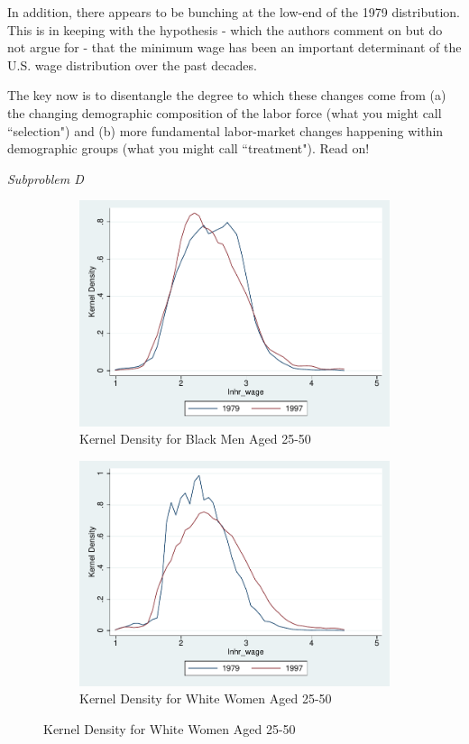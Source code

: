 \documentclass[11pt]{article}
\begin{document}
\bigskip In addition, there appears to be bunching at the low-end of the 1979 distribution. This is in keeping with the hypothesis - which the authors comment on but do not argue for - that the minimum wage has been an important determinant of the U.S. wage distribution over the past decades.

\bigskip The key now is to disentangle the degree to which these changes come from (a) the changing demographic composition of the labor force (what you might call ``selection") and (b) more fundamental labor-market changes happening within demographic groups (what you might call ``treatment"). Read on!

\bigskip \textit{Subproblem D}

\begin{figure}[H]
	\caption{Kernel Density for Selected Subsamples}
	\begin{subfigure}[H]{.5\textwidth}
		\caption{Kernel Density for Black Men Aged 25-50}
		\centering
		\includegraphics[width=1\textwidth]{Kernel_Density_Black_Men.pdf}
	\end{subfigure}
	\hfill
	\begin{subfigure}[H]{.5\textwidth}
		\caption{Kernel Density for White Women Aged 25-50}
		\centering
		\includegraphics[width=1\textwidth]{Kernel_Density_White_Women.pdf}
	\end{subfigure}
\end{figure}
\end{document}
